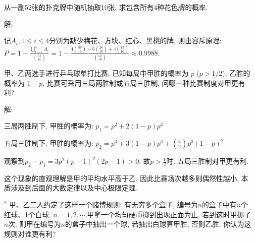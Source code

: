 \documentclass[standard]{ExBook}
\begin{document}
\begin{qitems}
    \begin{bbox}
    \begin{shaded}
        \qitem
从一副52张的扑克牌中随机抽取10张, 求包含所有4种花色牌的概率.
    \end{shaded}
    \end{bbox}

\vspace{-5em}

    \begin{bbox}
解: 

记$A_{i},1\leq i\leq4$分别为缺少梅花、方块、红心、黑桃的牌, 则由容斥原理: $P=1-\frac{\bigcup\limits_{i=1}^{4}A_{i}}{\binom{52}{10}}=1-\frac{4\binom{39}{10}-6\binom{26}{10}+4\binom{13}{10}}{\binom{52}{10}}\approx0.9988$.
    \end{bbox}

\vspace{-5em}

    \begin{bbox}
    \begin{shaded}
        \qitem
甲、乙两选手进行乒乓球单打比赛, 已知每局中甲胜的概率为 $p$ ($p > 1/2$), 乙胜的概率为 $1 - p$. 比赛可采用三局两胜制或五局三胜制, 问哪一种比赛制度对甲更有利?
    \end{shaded}
    \end{bbox}

\vspace{-5em}

    \begin{bbox}
解:

三局两胜制下, 甲胜的概率为: $p_{1}=p^2+2(1-p)p^2$

五局三胜制下, 甲胜的概率为: $p_{2}=p^3+3(1-p)p^3+\binom{4}{2}p^3(1-p)^2$

观察到$p_{2}-p_{1}=3p^2(p-1)^2(2p-1)>0$, 故$p>\frac{1}{2}$时, 五局三胜制对甲更有利.

\textcolor{themeColor}{\selectfont {} 这个现象的直观理解是甲的平均水平高于乙, 因此比赛场次越多则偶然性越小, 本质涉及到后面的大数定律以及中心极限定理.}
    \end{bbox}

\vspace{-5em}

    \begin{bbox}
    \begin{shaded}
        \qitem$^*$
甲、乙二人约定了这样一个赌博规则: 有无穷多个盒子, 编号为$n$的盒子中有$n$个红球、1个白球, $n=1,2,\cdots$.甲拿一个均匀硬币掷到出现正面为止, 若到这时甲掷了$n$次, 则甲在编号为$n$的盒子中抽出一个球, 若抽出白球算甲胜, 否则乙胜. 你认为这规则对谁更有利?
    \end{shaded}
    \end{bbox}


\end{qitems}
\end{document}
